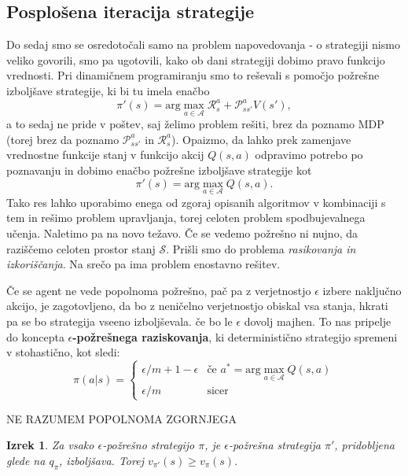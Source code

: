 \documentclass[12pt,a4paper]{amsart}
\theoremstyle{definition} %
\theoremstyle{plain} %
\newtheorem{izrek}[definicija]{Izrek}
\begin{document}
\subsection{Posplošena iteracija strategije}
Do sedaj smo se osredotočali samo na problem napovedovanja - o strategiji nismo veliko govorili, 
smo pa ugotovili, kako ob dani strategiji dobimo pravo funkcijo vrednosti. Pri dinamičnem 
programiranju smo to reševali s pomočjo požrešne izboljšave strategije, ki bi tu imela enačbo
$$
\pi'(s) = \text{arg}\max_{a \in \mathcal{A}} \mathcal{R}_s^a + \mathcal{P}_{ss'}^a V(s'),
$$
a to sedaj ne pride v poštev, saj želimo problem rešiti, brez da poznamo MDP (torej brez da 
poznamo $\mathcal{P}_{ss'}^a$ in $\mathcal{R}_s^a$). Opaizmo, da lahko prek zamenjave vrednostne 
funkcije stanj v funkcijo akcij $Q(s, a)$ odpravimo potrebo po poznavanju in dobimo enačbo požrešne
izboljšave strategije kot 
\begin{equation}\label{PIS}
    \pi'(s) = \text{arg}\max_{a \in \mathcal{A}} Q(s, a).
\end{equation}
Tako res lahko uporabimo enega od zgoraj opisanih algoritmov v kombinaciji s tem in rešimo problem 
upravljanja, torej celoten problem spodbujevalnega učenja. Naletimo pa na novo težavo. Če se vedemo
požrešno ni nujno, da raziščemo celoten prostor stanj $\mathcal{S}$. Prišli smo do problema 
\textit{rasikovanja in izkoriščanja}. Na srečo pa ima problem enostavno rešitev. 

Če se agent ne vede popolnoma požrešno, pač pa z verjetnostjo $\epsilon$ izbere naključno akcijo, 
je zagotovljeno, da bo z neničelno verjetnostjo obiskal vsa stanja, hkrati pa se bo strategija 
vseeno izboljševala. če bo le $\epsilon$ dovolj majhen. To nas pripelje do koncepta \textbf{
$\epsilon$-požrešnega raziskovanja}, ki deterministično strategijo spremeni v stohastično, kot
sledi:
\begin{equation}
    \pi(a|s) = \begin{cases}
                \epsilon / m + 1 - \epsilon & \text{če } a^* = \text{arg}\max_{a \in 
                    \mathcal{A}} Q(s, a) \\
                    \epsilon / m & \text{sicer}
               \end{cases}
\end{equation}

NE RAZUMEM POPOLNOMA ZGORNJEGA

\begin{izrek}
    Za vsako $\epsilon$-požrešno strategijo $\pi$, je $\epsilon$-požrešna strategija $\pi'$, 
    pridobljena glede na $q_\pi$, izboljšava. Torej $v_{\pi'}(s) \geq v_\pi(s)$. 
\end{izrek}
\end{document}
